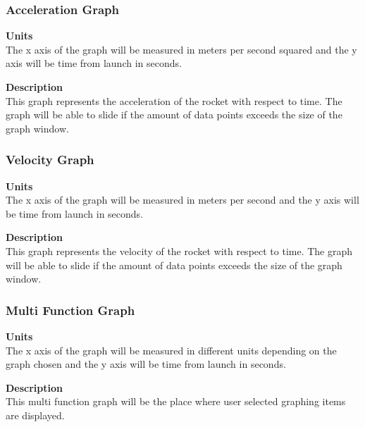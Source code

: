 \documentclass[10pt,draftclsnofoot,onecolumn,compsoc]{IEEEtran}
\begin{document}
\subsubsection{Acceleration Graph}
{\bf Units} \\ The x axis of the graph will be measured in meters per second squared and the y axis will be time from launch in seconds.\par
{\bf Description} \\ This graph represents the acceleration of the rocket with respect to time. The graph will be able to slide if the amount of data points exceeds the size of the graph window. \par

\subsubsection{Velocity Graph}
{\bf Units} \\ The x axis of the graph will be measured in meters per second and the y axis will be time from launch in seconds.\par
{\bf Description} \\ This graph represents the velocity of the rocket with respect to time. The graph will be able to slide if the amount of data points exceeds the size of the graph window. \par

\subsubsection{Multi Function Graph}
{\bf Units} \\ The x axis of the graph will be measured in different units depending on the graph chosen and the y axis will be time from launch in seconds.\par
{\bf Description} \\ This multi function graph will be the place where user selected graphing items are displayed. \par
\end{document}
